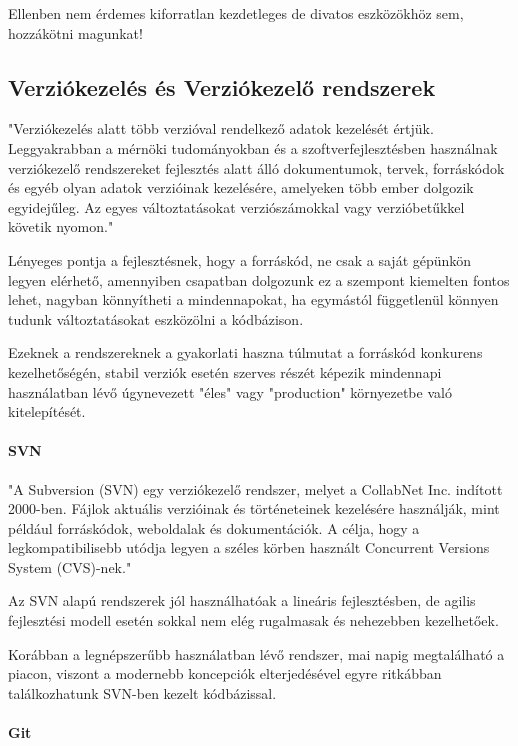Ellenben nem érdemes kiforratlan kezdetleges de divatos eszközökhöz sem, hozzákötni magunkat!

\subsection{Verziókezelés és Verziókezelő rendszerek}

"Verziókezelés alatt több verzióval rendelkező adatok kezelését értjük. Leggyakrabban a mérnöki tudományokban és a szoftverfejlesztésben használnak verziókezelő rendszereket fejlesztés alatt álló dokumentumok, tervek, forráskódok és egyéb olyan adatok verzióinak kezelésére, amelyeken több ember dolgozik egyidejűleg. Az egyes változtatásokat verziószámokkal vagy verzióbetűkkel követik nyomon."\cite{verziokezeles}

Lényeges pontja a fejlesztésnek, hogy a forráskód, ne csak a saját gépünkön legyen elérhető, amennyiben csapatban dolgozunk ez a szempont kiemelten fontos lehet, nagyban könnyítheti a mindennapokat, ha egymástól függetlenül könnyen tudunk változtatásokat eszközölni a kódbázison.

Ezeknek a rendszereknek a gyakorlati haszna túlmutat a forráskód konkurens kezelhetőségén, stabil verziók esetén szerves részét képezik mindennapi használatban lévő úgynevezett "éles" vagy "production" környezetbe való kitelepítését.

\paragraph{SVN}

"A Subversion (SVN) egy verziókezelő rendszer, melyet a CollabNet Inc. indított 2000-ben. Fájlok aktuális verzióinak és történeteinek kezelésére használják, mint például forráskódok, weboldalak és dokumentációk. A célja, hogy a legkompatibilisebb utódja legyen a széles körben használt Concurrent Versions System (CVS)-nek."\cite{svn}

Az SVN alapú rendszerek jól használhatóak a lineáris fejlesztésben, de agilis fejlesztési modell esetén sokkal nem elég rugalmasak és nehezebben kezelhetőek.

Korábban a legnépszerűbb használatban lévő rendszer, mai napig megtalálható a piacon, viszont a modernebb koncepciók elterjedésével egyre ritkábban találkozhatunk SVN-ben kezelt kódbázissal.

\paragraph{Git}

